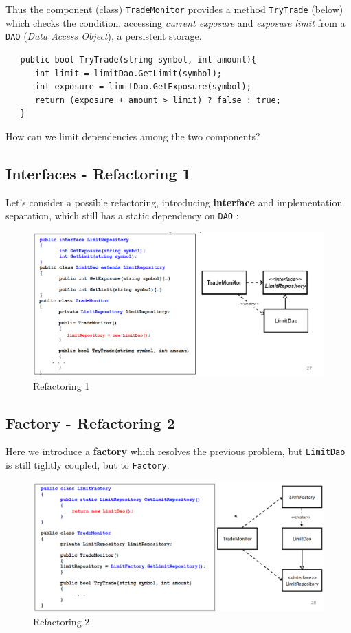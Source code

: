 Thus the component (class) \texttt{TradeMonitor} provides
a method \texttt{TryTrade} (below) which checks the condition,
accessing \textit{current exposure} and \textit{exposure limit} from a \texttt{DAO} (\textit{Data Access Object}), a persistent storage.
\begin{lstlisting}
   public bool TryTrade(string symbol, int amount){
      int limit = limitDao.GetLimit(symbol);
      int exposure = limitDao.GetExposure(symbol);
      return (exposure + amount > limit) ? false : true;
   }
\end{lstlisting}
How can we limit dependencies among the two components?
\subsection{Interfaces - Refactoring 1}
Let's consider a possible refactoring, introducing \textbf{interface} and implementation separation,
which still has a static dependency on \texttt{DAO} :
\begin{figure}[htbp]
   \centering
   \includegraphics{images/trademonitor_ref1.png}
   \caption{Refactoring 1}
   \label{fig:trademonitor_ref1}
\end{figure}

\subsection{Factory - Refactoring 2}
Here we introduce a \textbf{factory} which resolves the previous problem, but \texttt{LimitDao} is still tightly coupled, but to \texttt{Factory}.

\begin{figure}[htbp]
   \centering
   \includegraphics{images/trademonitor_ref2.png}
   \caption{Refactoring 2}
   \label{fig:trademonitor_ref2}
\end{figure}

